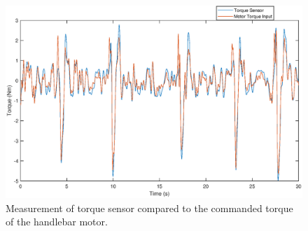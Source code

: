 \begin{figure}[h]
    \centering
    \captionsetup{justification=centering,margin=2cm}

    \includegraphics[scale=0.5]{images/results_torque_sensor.eps}
        \caption[Short title]{Measurement of torque sensor compared to the commanded torque of the handlebar motor.}
    \label{fig:figure7}
\end{figure}